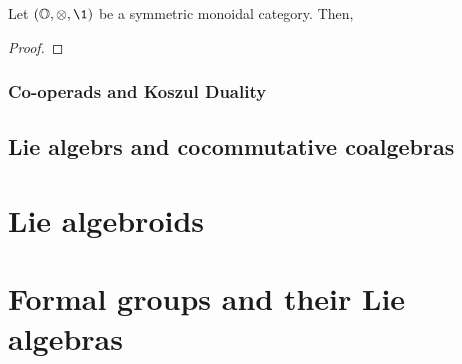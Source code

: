                 \begin{proposition} \label{prop: symmetirc_operads_universal_property}
                    Let $(\O, \tensor, \1)$ be a symmetric monoidal category. Then, 
                \end{proposition}
                    \begin{proof}
                        
                    \end{proof}
                    
            \subsubsection{Co-operads and Koszul Duality}
            
        \subsection{Lie algebrs and cocommutative coalgebras}
        
    \section{Lie algebroids}
        
    \section{Formal groups and their Lie algebras} \label{section: lie_algebras_and_formal_groups}